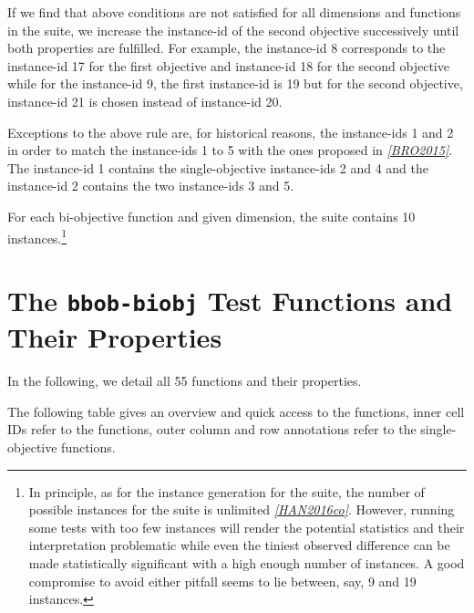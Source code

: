 \documentclass[letterpaper,12pt,english]{article}
\begin{document}
If we find that above conditions are not satisfied for all dimensions and
functions in the  suite, we increase the instance-id of the
second objective successively until both properties are fulfilled.
For example, the  instance-id
8 corresponds to the instance-id 17 for the first objective and instance-id 18 for
the second objective while for the  instance-id 9, the
first instance-id is 19 but for the second objective, instance-id 21 is chosen
instead of instance-id 20.

Exceptions to the above rule are, for historical reasons, the
 instance-ids 1 and 2 in order to match the instance-ids
1 to 5 with the ones proposed in \label{index:id10}{\hyperref[index:bro2015]{\emph{{[}BRO2015{]}}}}. The 
instance-id 1 contains the single-objective instance-ids 2 and 4 and
the  instance-id 2 contains the two instance-ids 3 and 5.

For each bi-objective function and given dimension, the  suite
contains 10 instances.\footnote[2]{
In principle, as for the instance generation for the  suite,
the number of possible instances for the  suite is unlimited
\label{index:id13}{\hyperref[index:han2016co]{\emph{{[}HAN2016co{]}}}}.
However, running some tests with too few instances will render the
potential statistics and their interpretation problematic while even the
tiniest observed difference can be made statistically significant with a
high enough number of instances. A good compromise to avoid either pitfall
seems to lie between, say, 9 and 19 instances.
}


\section{The \texttt{bbob-biobj} Test Functions and Their Properties}
\label{index:sec-test-functions}\label{index:the-bbob-biobj-test-functions-and-their-properties}
In the following, we detail all 55  functions
and their properties.

The following table gives an overview and quick access to the functions,
inner cell IDs refer to the  functions, outer column and row
annotations refer to the single-objective  functions.
\end{document}
